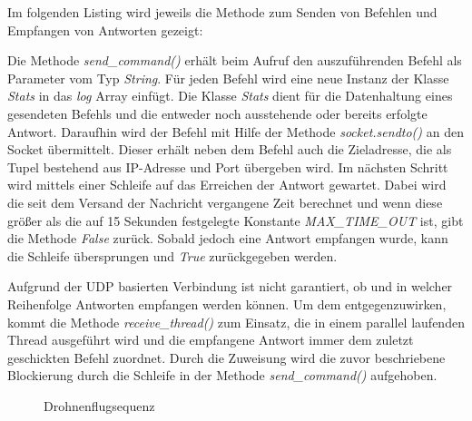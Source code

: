 Im folgenden Listing wird jeweils die Methode zum Senden von Befehlen und Empfangen von Antworten gezeigt:



Die Methode \textit{send\_command()} erhält beim Aufruf den auszuführenden Befehl als Parameter vom Typ \textit{String}. Für jeden Befehl wird eine neue Instanz der Klasse \textit{Stats} in das \textit{log} Array einfügt. Die Klasse \textit{Stats} dient für die Datenhaltung eines gesendeten Befehls und die entweder noch ausstehende oder bereits erfolgte Antwort. Daraufhin wird der Befehl mit Hilfe der Methode \textit{socket.sendto()} an den Socket übermittelt. Dieser erhält neben dem Befehl auch die Zieladresse, die als Tupel bestehend aus IP-Adresse und Port übergeben wird. Im nächsten Schritt wird mittels einer Schleife auf das Erreichen der Antwort gewartet. Dabei wird die seit dem Versand der Nachricht vergangene Zeit berechnet und wenn diese größer als die auf 15 Sekunden festgelegte Konstante \textit{MAX\_TIME\_OUT} ist, gibt die Methode \textit{False} zurück. Sobald jedoch eine Antwort empfangen wurde, kann die Schleife übersprungen und \textit{True} zurückgegeben werden.

Aufgrund der UDP basierten Verbindung ist nicht garantiert, ob und in welcher Reihenfolge Antworten empfangen werden können. Um dem entgegenzuwirken, kommt die Methode \textit{receive\_thread()} zum Einsatz, die in einem parallel laufenden Thread ausgeführt wird und die empfangene Antwort immer dem zuletzt geschickten Befehl zuordnet. Durch die Zuweisung wird die zuvor beschriebene Blockierung durch die Schleife in der Methode \textit{send\_command()} aufgehoben. 

\begin{figure}[ht]
	\caption[Drohnenflugsequenz]{Drohnenflugsequenz} 
	\label{sequenz}
\end{figure} 

